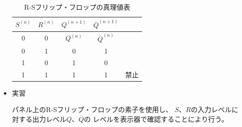 \documentclass[12pt]{jarticle}
\begin{document}
\begin{itemize}
          \begin{table}[h]
              \caption{R-Sフリップ・フロップの真理値表}
              \begin{center}
                  \begin{tabular}{|c|c|c|c||c|}
                      \hline
                      $S^{(n)}$ & $R^{(n)}$ & $Q^{(n+1)}$ & ${\overline{Q}}^{(n+1)}$ &      \\
                      \hline
                      0         & 0         & $Q^{(n)}$   & ${\overline{Q}}^{(n)}$   &      \\
                      \hline
                      0         & 1         & 0           & 1                        &      \\
                      \hline
                      1         & 0         & 1           & 0                        &      \\
                      \hline
                      1         & 1         & 1           & 1                        & 禁止 \\
                      \hline
                  \end{tabular}
              \end{center}
              \label{table12}
          \end{table}

    \item 実習

          パネル上のR-Sフリップ・フロップの素子を使用し、
          $S$、$R$の入力レベルに対する出力レベル$Q$、$\overline{Q}$の
          レベルを表示器で確認することにより行う。
\end{itemize}

\clearpage
\end{document}
